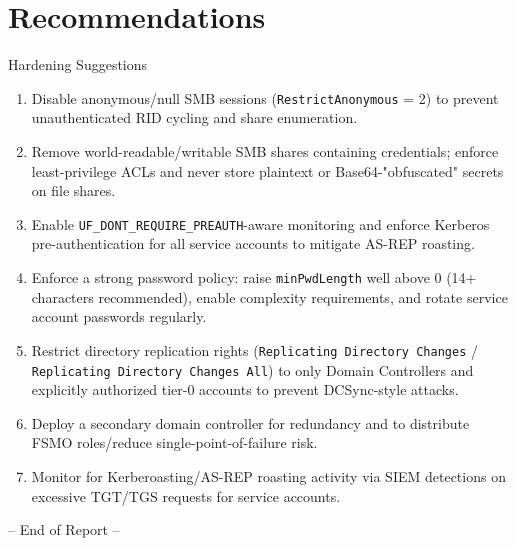 \documentclass[11pt]{article}
\begin{document}
\section{Recommendations}
\begin{sectionbox}{Hardening Suggestions}
\begin{enumerate}[leftmargin=1.4em]
  \item Disable anonymous/null SMB sessions (\texttt{RestrictAnonymous} = 2) to
        prevent unauthenticated RID cycling and share enumeration.
  \item Remove world-readable/writable SMB shares containing credentials; enforce
        least-privilege ACLs and never store plaintext or Base64-"obfuscated"
        secrets on file shares.
  \item Enable \texttt{UF\_DONT\_REQUIRE\_PREAUTH}-aware monitoring and enforce Kerberos
        pre-authentication for all service accounts to mitigate AS-REP roasting.
  \item Enforce a strong password policy: raise \texttt{minPwdLength} well above 0
        (14+ characters recommended), enable complexity requirements, and rotate
        service account passwords regularly.
  \item Restrict directory replication rights (\texttt{Replicating Directory Changes} /
        \texttt{Replicating Directory Changes All}) to only Domain Controllers and
        explicitly authorized tier-0 accounts to prevent DCSync-style attacks.
  \item Deploy a secondary domain controller for redundancy and to distribute
        FSMO roles/reduce single-point-of-failure risk.
  \item Monitor for Kerberoasting/AS-REP roasting activity via SIEM detections on
        excessive TGT/TGS requests for service accounts.
\end{enumerate}
\end{sectionbox}

\vspace{1cm}
\begin{center}
{\small\color{graytext} -- End of Report --}
\end{center}
\end{document}
